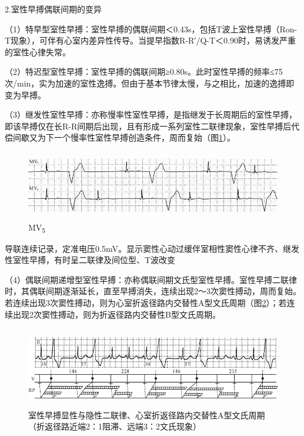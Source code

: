 2.室性早搏偶联间期的变异

（1）特早型室性早搏：室性早搏的偶联间期＜0.43s，包括T波上室性早搏（Ron-T现象），可伴有心室内差异性传导。当提早指数R-R′/Q-T＜0.90时，易诱发严重的室性心律失常。

（2）特迟型室性早搏：室性早搏的偶联间期≥0.80s。此时室性早搏的频率≤75次/min，实为加速的室性逸搏。但由于基本节律太慢，与之相比，加速的逸搏即变为早搏。

（3）继发性室性早搏：亦称慢率性室性早搏，是指继发于长周期后的室性早搏，即该早搏仅在长R-R间期后出现，且有形成一系列室性二联律现象，室性早搏后代偿间歇又为下一个慢率性室性早搏创造条件，周而复始（图\ref{fig11-24}）。

\begin{figure}[!htbp]
 \centering
 \includegraphics[width=5.58333in,height=1.1875in]{./images/Image00184.jpg}
 \captionsetup{justification=centering}
 \caption{MV\textsubscript{5}}
 \label{fig11-24}
  \end{figure} 
导联连续记录，定准电压0.5mV。显示窦性心动过缓伴室相性窦性心律不齐、继发性室性早搏，有时呈二联律及间位型、T波改变

（4）偶联间期递增型室性早搏：亦称偶联间期文氏型室性早搏。室性早搏二联律时，其偶联间期逐渐延长，直至早搏消失，连续出现2～3次窦性搏动，周而复始。若连续出现3次窦性搏动，则为心室折返径路内交替性A型文氏周期（图\ref{fig11-25}）；若连续出现2次窦性搏动，则为折返径路内交替性B型文氏周期。

\begin{figure}[!htbp]
 \centering
 \includegraphics[width=5.67708in,height=1.38542in]{./images/Image00185.jpg}
 \captionsetup{justification=centering}
 \caption{室性早搏显性与隐性二联律、心室折返径路内交替性A型文氏周期（折返径路近端2：1阻滞、远端3：2文氏现象）}
 \label{fig11-25}
  \end{figure} 

